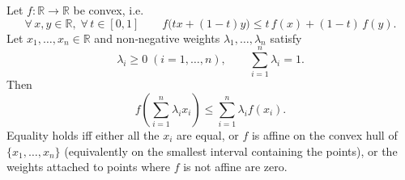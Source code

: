 \begin{theorem}
Let \(f:\mathbb{R}\to\mathbb{R}\) be convex, i.e.
\[
\forall\,x,y\in\mathbb{R},\;\forall\,t\in[0,1]\qquad
f\bigl(t x+(1-t)y\bigr)\le t\,f(x)+(1-t)\,f(y). \tag{1}
\]
Let \(x_{1},\dots ,x_{n}\in\mathbb{R}\) and non‑negative weights
\(\lambda_{1},\dots ,\lambda_{n}\) satisfy
\[
\lambda_{i}\ge0\;(i=1,\dots ,n),\qquad
\sum_{i=1}^{n}\lambda_{i}=1. \tag{2}
\]
Then
\[
f\!\left(\sum_{i=1}^{n}\lambda_{i}x_{i}\right)\le
\sum_{i=1}^{n}\lambda_{i}f(x_{i}). \tag{3}
\]
Equality holds iff either all the \(x_{i}\) are equal, or \(f\) is affine on
the convex hull of \(\{x_{1},\dots ,x_{n}\}\) (equivalently on the smallest
interval containing the points), or the weights attached to points where
\(f\) is not affine are zero.
\end{theorem}

